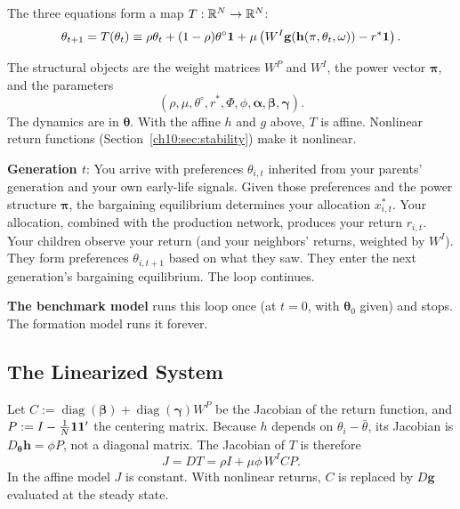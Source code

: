 \documentclass[../structural_economics_book.tex]{subfiles}
\begin{document}
The three equations form a map $T: \mathbb{R}^N \to \mathbb{R}^N$:
\begin{equation}\label{ch10:eq:map}
\theta_{t+1} = T(\theta_t) \equiv \rho\theta_t + (1-\rho)\theta^{\circ}\mathbf{1} + \mu\left(W^I \mathbf{g}(\mathbf{h}(\pi, \theta_t, \omega)) - r^*\mathbf{1}\right).
\end{equation}

The structural objects are the weight matrices $W^P$ and $W^I$, the power vector $\boldsymbol{\pi}$, and the parameters
\[
(\rho, \mu, \theta^{\circ}, r^*, \Phi, \phi, \boldsymbol{\alpha}, \boldsymbol{\beta}, \boldsymbol{\gamma}).
\] The dynamics are in $\boldsymbol{\theta}$. With the affine $h$ and $g$ above, $T$ is affine. Nonlinear return functions (Section~\ref{ch10:sec:stability}) make it nonlinear.

\begin{intuition}
\textbf{Generation $t$}: You arrive with preferences $\theta_{i,t}$ inherited from your parents' generation and your own early-life signals. Given those preferences and the power structure $\boldsymbol{\pi}$, the bargaining equilibrium determines your allocation $x_{i,t}^*$. Your allocation, combined with the production network, produces your return $r_{i,t}$. Your children observe your return (and your neighbors' returns, weighted by $W^I$). They form preferences $\theta_{i,t+1}$ based on what they saw. They enter the next generation's bargaining equilibrium. The loop continues.

\textbf{The benchmark model} runs this loop once (at $t = 0$, with $\boldsymbol{\theta}_0$ given) and stops. The formation model runs it forever.
\end{intuition}


\subsection{The Linearized System}

Let $C := \operatorname{diag}(\boldsymbol{\beta}) + \operatorname{diag}(\boldsymbol{\gamma})W^P$ be the Jacobian of the return function, and $P := I - \frac{1}{N}\mathbf{1}\mathbf{1}'$ the centering matrix. Because $h$ depends on $\theta_i - \bar{\theta}$, its Jacobian is $D_{\boldsymbol{\theta}}\mathbf{h} = \phi P$, not a diagonal matrix. The Jacobian of $T$ is therefore
\begin{equation}\label{ch10:eq:jacobian}
J = DT = \rho I + \mu\phi\, W^I C P.
\end{equation}
In the affine model $J$ is constant. With nonlinear returns, $C$ is replaced by $D\mathbf{g}$ evaluated at the steady state.
\end{document}
